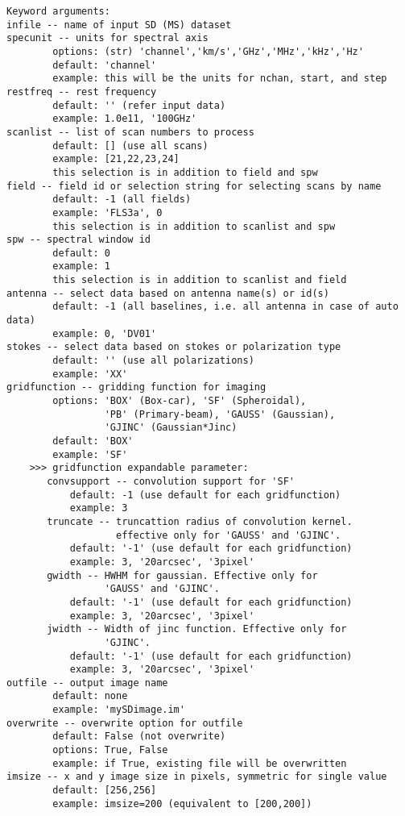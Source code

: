 \begin{verbatim}
Keyword arguments:
infile -- name of input SD (MS) dataset
specunit -- units for spectral axis
        options: (str) 'channel','km/s','GHz','MHz','kHz','Hz'
        default: 'channel'
        example: this will be the units for nchan, start, and step
restfreq -- rest frequency
        default: '' (refer input data)
        example: 1.0e11, '100GHz'
scanlist -- list of scan numbers to process
        default: [] (use all scans)
        example: [21,22,23,24]
        this selection is in addition to field and spw
field -- field id or selection string for selecting scans by name
        default: -1 (all fields)
        example: 'FLS3a', 0
        this selection is in addition to scanlist and spw
spw -- spectral window id
        default: 0
        example: 1
        this selection is in addition to scanlist and field
antenna -- select data based on antenna name(s) or id(s)
        default: -1 (all baselines, i.e. all antenna in case of auto data)
        example: 0, 'DV01'
stokes -- select data based on stokes or polarization type 
        default: '' (use all polarizations)
        example: 'XX'
gridfunction -- gridding function for imaging
        options: 'BOX' (Box-car), 'SF' (Spheroidal), 
                 'PB' (Primary-beam), 'GAUSS' (Gaussian),
                 'GJINC' (Gaussian*Jinc)
        default: 'BOX'
        example: 'SF'
    >>> gridfunction expandable parameter:
       convsupport -- convolution support for 'SF' 
           default: -1 (use default for each gridfunction)
           example: 3
       truncate -- truncattion radius of convolution kernel.
                   effective only for 'GAUSS' and 'GJINC'.
           default: '-1' (use default for each gridfunction)
           example: 3, '20arcsec', '3pixel'
       gwidth -- HWHM for gaussian. Effective only for 
                 'GAUSS' and 'GJINC'.
           default: '-1' (use default for each gridfunction)
           example: 3, '20arcsec', '3pixel'
       jwidth -- Width of jinc function. Effective only for 
                 'GJINC'.
           default: '-1' (use default for each gridfunction)
           example: 3, '20arcsec', '3pixel'
outfile -- output image name
        default: none
        example: 'mySDimage.im'
overwrite -- overwrite option for outfile
        default: False (not overwrite)
        options: True, False
        example: if True, existing file will be overwritten
imsize -- x and y image size in pixels, symmetric for single value
        default: [256,256]
        example: imsize=200 (equivalent to [200,200])

\end{verbatim}
